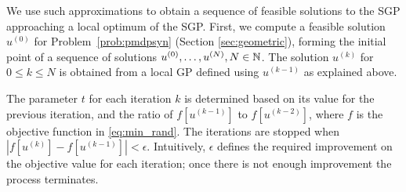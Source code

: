 We use such approximations to obtain a sequence of feasible solutions to the SGP approaching a local optimum of the SGP. 
First, we compute a feasible solution $u^{(0)}$ for Problem~\ref{prob:pmdpsyn} (Section \ref{sec:geometric}), 
%
forming the initial point of a sequence of solutions $u^{(0)},\ldots, u^{(N)}, N \in \mathbb{N}$. 
The solution $u^{(k)}$ for $0\leq k\leq N$ is obtained from a local GP defined using $u^{(k-1)}$ as explained above.



The parameter $t$ for each iteration $k$ is determined based on its value for the previous iteration, and the ratio of $ f\left[u^{(k-1)}\right] $ to $f\left[u^{(k-2)}\right]$, where $f$ is the objective function in \eqref{eq:min_rand}. The iterations are stopped when $\left| f\left[u^{(k)}\right] - f\left[u^{(k-1)}\right] \right| <  \epsilon$. Intuitively, $\epsilon$ defines the required improvement on the objective value for each iteration; once there is not enough improvement the process terminates.


